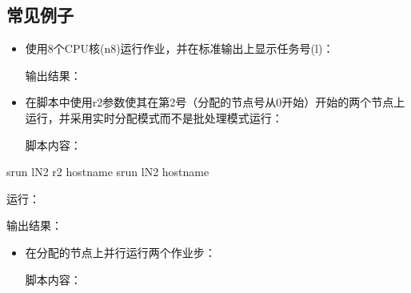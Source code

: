 \documentclass[a4paper,12pt,english]{sphinxmanual}
\begin{document}
\subsection{常见例子}
\label{\detokenize{slurm/slurm:id24}}\begin{itemize}
\item {} 
\sphinxAtStartPar
使用8个CPU核(\sphinxhyphen{}n8)运行作业，并在标准输出上显示任务号(\sphinxhyphen{}l)：

\sphinxAtStartPar
{}

\sphinxAtStartPar
输出结果：

\end{itemize}

\begin{sphinxVerbatim}[commandchars=\\\{\}]
 
 
 
 
 
 
 
 
\end{sphinxVerbatim}
\begin{itemize}
\item {} 
\sphinxAtStartPar
在脚本中使用\sphinxhyphen{}r2参数使其在第2号（分配的节点号从0开始）开始的两个节点上运行，并采用实时分配模式而不是批处理模式运行：

\sphinxAtStartPar
脚本内容：

\end{itemize}

\begin{sphinxVerbatim}[commandchars=\\\{\}]
 
srun \PYGZhy{}lN2 \PYGZhy{}r2 hostname
srun \PYGZhy{}lN2 hostname
\end{sphinxVerbatim}

\sphinxAtStartPar
运行： 

\sphinxAtStartPar
输出结果：

\begin{sphinxVerbatim}[commandchars=\\\{\}]
\PYG{p}{[}\PYG{p}{]}
 
 
 
 
\end{sphinxVerbatim}
\begin{itemize}
\item {} 
\sphinxAtStartPar
在分配的节点上并行运行两个作业步：

\sphinxAtStartPar
脚本内容：

\end{itemize}
\end{document}
